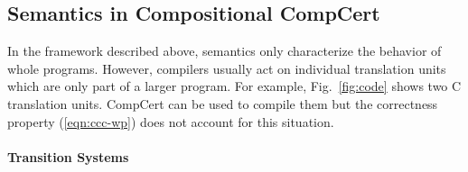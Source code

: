 \documentclass[acmsmall,screen,review,anonymous]{acmart}
\begin{document}
\subsection{Semantics in Compositional CompCert} %

In the framework described above,
semantics only characterize the behavior of whole programs.
However, compilers usually act on individual translation units
which are only part of a larger program.
For example,
Fig.~\ref{fig:code} shows two C translation units.
CompCert can be used to compile them
but the correctness property (\ref{eqn:ccc-wp})
does not account for this situation.

\paragraph{Transition Systems} %
\end{document}
